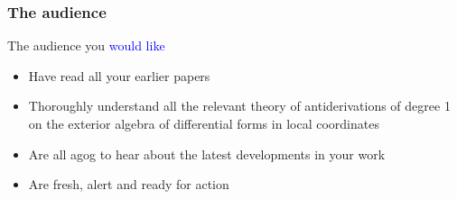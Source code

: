 \documentclass[aspectratio=43,10pt,ucs]{beamer} %
\begin{document}
\begin{frame}
  \frametitle{The audience}

  The audience you \textcolor{blue}{would like}
  \begin{itemize}
  \item Have read all your earlier papers
  \item Thoroughly understand all the relevant theory of
    antiderivations of degree 1 on the exterior algebra of
    differential forms in local coordinates
  \item Are all agog to hear about the latest developments in your
    work
  \item Are fresh, alert and ready for action
  \end{itemize}

  \vspace*{1em}


  \vspace*{1em}


\end{frame}
\end{document}

